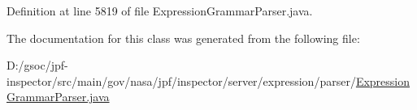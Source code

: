 Definition at line 5819 of file Expression\+Grammar\+Parser.\+java.



The documentation for this class was generated from the following file\+:\begin{DoxyCompactItemize}
\item 
D\+:/gsoc/jpf-\/inspector/src/main/gov/nasa/jpf/inspector/server/expression/parser/\hyperlink{_expression_grammar_parser_8java}{Expression\+Grammar\+Parser.\+java}\end{DoxyCompactItemize}
